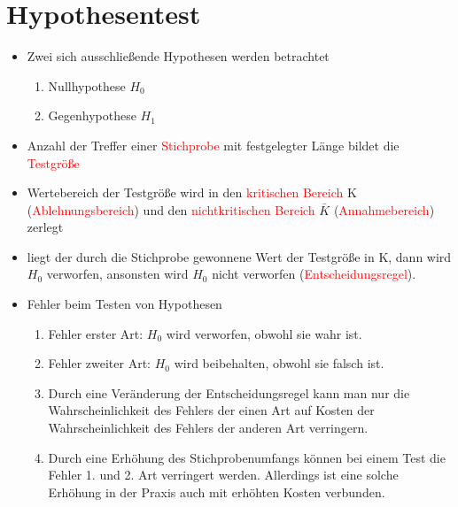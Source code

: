 \section{Hypothesentest}
\begin{itemize}
\item Zwei sich ausschließende Hypothesen werden betrachtet
\begin{enumerate}
\item Nullhypothese $H_0$ 
\item Gegenhypothese $H_1$
\end{enumerate}
\item Anzahl der Treffer einer \textcolor{red}{Stichprobe} mit festgelegter Länge bildet die \textcolor{red}{Testgröße}
\item Wertebereich der Testgröße wird in den \textcolor{red}{kritischen Bereich} K (\textcolor{red}{Ablehnungsbereich}) und den \textcolor{red}{nichtkritischen Bereich} $\bar{K}$  (\textcolor{red}{Annahmebereich}) zerlegt
\item liegt der durch die Stichprobe gewonnene Wert der Testgröße in K, dann wird $H_0$ verworfen, ansonsten wird $H_0$ nicht verworfen (\textcolor{red}{Entscheidungsregel}). 
\item Fehler beim Testen von Hypothesen\\

\begin{enumerate}
\item Fehler erster Art: $H_0$ wird verworfen, obwohl sie wahr ist. 
\item Fehler zweiter Art: $H_0$ wird beibehalten, obwohl sie falsch ist.
\item Durch eine Veränderung der Entscheidungsregel kann man nur die Wahrscheinlichkeit
des Fehlers der einen Art auf Kosten der Wahrscheinlichkeit des Fehlers der anderen Art verringern.
\item Durch eine Erhöhung des Stichprobenumfangs können bei einem Test die Fehler
1. und 2. Art verringert werden. Allerdings ist eine solche Erhöhung in der Praxis auch mit erhöhten Kosten verbunden.
\end{enumerate}
\end{itemize}
